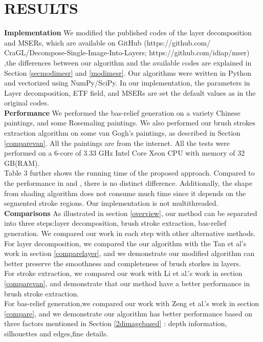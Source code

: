 \chapter{RESULTS}\label{result}

\textbf{Implementation}  We modified the published codes of the layer decomposition and MSERs, which are available on GitHub (https://github.com/ CraGL/Decompose-Single-Image-Into-Layers; https://github.com/idiap/mser) ,the differences between our algorithm and the available codes are explained in Section \ref{secmodimesr} and \ref{modimesr}. Our algorithms were written in Python and vectorized using NumPy/SciPy. In our implementation, the parameters in Layer decomposition, ETF field, and MSERs are set the default values as in the original codes.\\ 
\textbf{Performance}  We performed the bas-relief generation on a variety Chinese paintings, and some Rosemaling paintings. We also performed our brush strokes extraction algorithm on some van Gogh's paintings, as described in Section \ref{comparevan}. All the paintings are from the internet.  All the tests were performed on a 6-core of 3.33 GHz Intel Core Xeon CPU with memory of 32 GB(RAM).\\
Table 3 further shows the running time of the proposed approach. Compared to the performance in \cite{tan2016decomposing} and \cite{nister2008linear}, there is no distinct difference. Additionally, the shape from shading algorithm does not consume much time since it depends on the segmented stroke regions. Our implementation is not multithreaded. \\
\textbf{Comparisons}  
As illustrated in section \ref{overview}, our method can be separated into three steps:layer decomposition, brush stroke extraction, bas-relief generation. We compared our work in each step with other alternative methods.\\
For layer decomposition, we compared the our algorithm with the Tan et al's work \cite{tan2016decomposing} in section \ref{comparelayer}, and we demonstrate our modified algorithm can better preserve the smoothness and completeness of brush storkes in layers. \\
For stroke extraction, we compared our work with Li et al.'s work \cite{li2012rhythmic} in section \ref{comparevan}, and demonstrate that our method have a better performance in brush stroke extraction.\\
For bas-relief generation,we compared our work with Zeng et al.'s work \cite{zeng2014region} in section \ref{compare}, and we demonstrate our algorithm has better performance based on three factors mentioned in Section \ref{2dimagebased} : depth information, silhouettes and edges,fine details. \\
